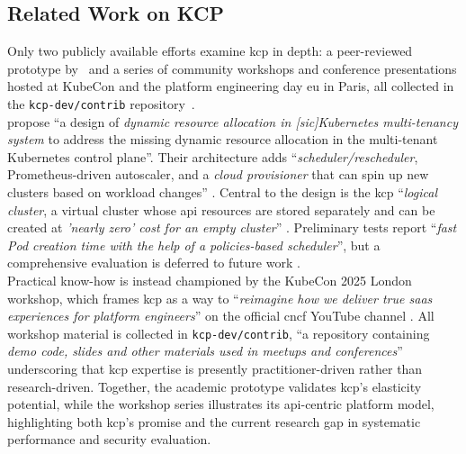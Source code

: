 \documentclass[11pt, a4paper, oneside, listof=totoc]{scrartcl}
\newcommand{\sic}{\textnormal{\textit{[sic]}}}
\begin{document}
            \cleardoublepage

        \subsection{Related Work on KCP}\label{subsec:relatedKCP}
            Only two publicly available efforts examine \gls{kcp} in depth: a peer-reviewed
            prototype by~\cite{nguyen2022} and a series of community workshops and conference
            presentations hosted at KubeCon and the platform engineering day \gls{eu} in Paris, all
            collected in the \texttt{kcp-dev/contrib} repository~\cite{kcpContrib}.
            \\
            \textcite{nguyen2022} propose \enquote{a design of
            \textit{dynamic resource allocation in \sic Kubernetes multi-tenancy system} to address
            the missing dynamic resource allocation in the multi-tenant Kubernetes control plane}.
            Their architecture adds \enquote{\textit{scheduler/rescheduler}, Prometheus-driven
            autoscaler, and a \textit{cloud provisioner} that can spin up new clusters based on
            workload changes} \parencite[p.~653]{nguyen2022}.
            Central to the design is the \gls{kcp} \enquote{\textit{logical cluster}, a virtual
            cluster whose \gls{api} resources are stored separately and can be created at
            \textit{'nearly zero' cost for an empty cluster}} \parencite[p.~652]{nguyen2022}.
            Preliminary tests report \enquote{\textit{fast Pod creation time with the help of a
            policies-based scheduler}}, but a comprehensive evaluation is deferred to future work
            \parencites[p.~651]{nguyen2022}[p.~654]{nguyen2022}.
            \\
            Practical know-how is instead championed by the KubeCon 2025 London workshop, which
            frames \gls{kcp} as a way to \enquote{\textit{reimagine how we deliver true \gls{saas}
            experiences for platform engineers}} on the official \gls{cncf} YouTube channel
            \parencite{kubeconLondonYT}.
            All workshop material is collected in \texttt{kcp-dev/contrib}, \enquote{a repository
            containing
            \textit{demo code, slides and other materials used in meetups and conferences}}
            \parencite{kcpContrib} underscoring that \gls{kcp} expertise is presently
            practitioner-driven rather than research-driven.
            Together, the academic prototype validates \gls{kcp}'s elasticity potential, while the
            workshop series illustrates its \gls{api}-centric platform model, highlighting both
            \gls{kcp}'s promise and the current research gap in systematic performance and security
            evaluation.
\end{document}
